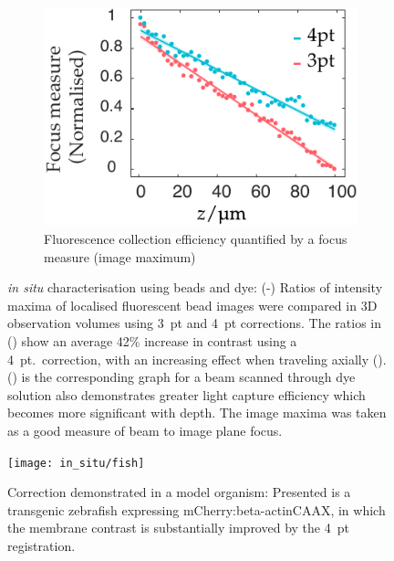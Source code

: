 \begin{figure}
\begin{subfigure}[t]{0.45\textwidth}
        \centering
        \includegraphics{in_situ/axial_travel_thesis}
        \caption{Fluorescence collection efficiency quantified by a focus measure (image maximum)}\label{fig:in_situ/axial_travel_thesis}
    \end{subfigure}
    \caption[\emph{in situ} characterisation using beads and dye]{\emph{in situ} characterisation using beads and dye:
    (-) Ratios of intensity maxima of localised fluorescent bead images
    were compared in \gls{3D} observation volumes %
    using 3~pt and 4~pt corrections.
    The ratios in () show an %
    average 42\% increase in contrast using a 4~pt.~correction, %
    with an increasing effect when traveling axially ().
    () is the corresponding graph for a beam scanned through dye solution also demonstrates greater light capture efficiency which becomes more significant with depth.
    The image maxima was taken as a good measure of beam to image plane focus.
    }\label{fig:in_situ}
\end{figure}

\begin{figure}
  \centering
  \texttt{[image: in\_situ/fish]}
  \caption[Correction demonstrated in a model organism]{Correction demonstrated in a model organism:
  Presented is a transgenic \gls{zebrafish} expressing mCherry:beta-actinCAAX, in which the membrane contrast is substantially improved by the 4~pt registration.%
  }\label{fig:homofish}
\end{figure}

